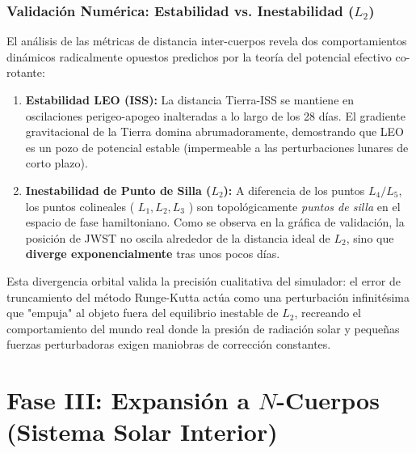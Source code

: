 \documentclass[11pt, a4paper]{article}
\begin{document}
	\subsubsection{Validación Numérica: Estabilidad vs. Inestabilidad ($L_2$)}
	El análisis de las métricas de distancia inter-cuerpos revela dos comportamientos dinámicos radicalmente opuestos predichos por la teoría del potencial efectivo co-rotante:
	
	\begin{enumerate}
		\item \textbf{Estabilidad LEO (ISS):} La distancia Tierra-ISS se mantiene en oscilaciones perigeo-apogeo inalteradas a lo largo de los 28 días. El gradiente gravitacional de la Tierra domina abrumadoramente, demostrando que LEO es un pozo de potencial estable (impermeable a las perturbaciones lunares de corto plazo).
		\item \textbf{Inestabilidad de Punto de Silla ($L_2$):} A diferencia de los puntos $L_4/L_5$, los puntos colineales ( $L_1, L_2, L_3$ ) son topológicamente \textit{puntos de silla} en el espacio de fase hamiltoniano. Como se observa en la gráfica de validación, la posición de JWST no oscila alrededor de la distancia ideal de $L_2$, sino que \textbf{diverge exponencialmente} tras unos pocos días. 
	\end{enumerate}
	
	
	Esta divergencia orbital valida la precisión cualitativa del simulador: el error de truncamiento del método Runge-Kutta actúa como una perturbación infinitésima que "empuja" al objeto fuera del equilibrio inestable de $L_2$, recreando el comportamiento del mundo real donde la presión de radiación solar y pequeñas fuerzas perturbadoras exigen maniobras de corrección constantes.
	
	\section{Fase III: Expansión a $N$-Cuerpos (Sistema Solar Interior)}
	
\end{document}
